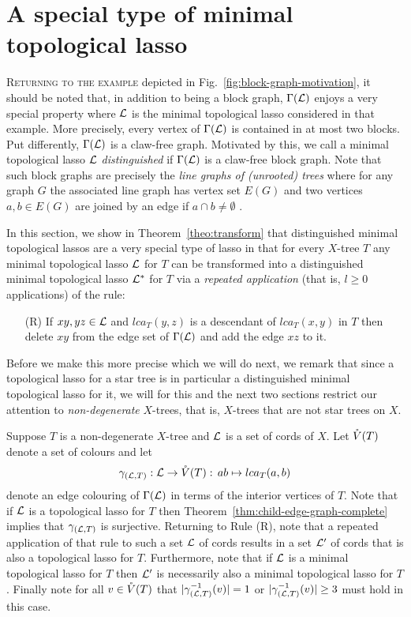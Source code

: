 \section{A special type of minimal topological lasso}
\label{sec:distinguished}

\textsc{Returning to the example} depicted in
Fig.~\ref{fig:block-graph-motivation}, it should be noted that, in addition to
being a block graph, $\Gamma({\mathcal L})$ enjoys a very special property where ${\mathcal L}$
is the minimal topological lasso considered in that example. More precisely,
every vertex of $\Gamma({\mathcal L})$ is contained in at most two blocks.  Put
differently, $\Gamma({\mathcal L})$ is a claw-free graph. Motivated by this, we call a
minimal topological lasso ${\mathcal L}$ {\em distinguished} if $\Gamma({\mathcal L})$ is a
claw-free block graph.  Note that such block graphs are precisely the {\em
  line graphs of (unrooted) trees} where for any graph $G$ the associated line
graph has vertex set $E(G)$ and two vertices $a,b\in E(G)$ are joined by an
edge if $a\cap b\not=\emptyset$ \cite{H72}.

In this section, we show in Theorem~\ref{theo:transform} that distinguished
minimal topological lassos are a very special type of lasso in that for every
$X$-tree $T$ any minimal topological lasso ${\mathcal L}$ for $T$ can be transformed
into a distinguished minimal topological lasso ${\mathcal L}^*$ for $T$ via a {\em
  repeated application} (that is, $l\geq 0$ applications) of the rule:

\begin{enumerate}
\item[(R)] If $xy,yz\in {\mathcal L}$ and $lca_T(y,z)$ is a descendant of $lca_T(x,y)$
  in $T$ then delete $xy$ from the edge set of $\Gamma({\mathcal L})$ and add the edge
  $xz$ to it.
\end{enumerate}

Before we make this more precise which we will do next, we remark that since a
topological lasso for a star tree is in particular a distinguished minimal
topological lasso for it, we will for this and the next two sections restrict
our attention to {\em non-degenerate} $X$-trees, that is, $X$-trees that are
not star trees on $X$.

Suppose $T$ is a non-degenerate $X$-tree and ${\mathcal L}$ is a set of cords of
$X$. Let $\mathring{V}(T)$ denote a set of colours and let
$$
\gamma_{({\mathcal L},T)}:{\mathcal L}\to \mathring{V}(T):\, ab\mapsto lca_T(a,b)
$$
denote an edge colouring of $\Gamma({\mathcal L})$ in terms of the interior vertices of
$T$. Note that if ${\mathcal L}$ is a topological lasso for $T$ then
Theorem~\ref{thm:child-edge-graph-complete} implies that $\gamma_{({\mathcal L},T)}$
is surjective. Returning to Rule (R), note that a repeated application of that
rule to such a set ${\mathcal L}$ of cords results in a set ${\mathcal L}'$ of cords that is
also a topological lasso for $T$. Furthermore, note that if ${\mathcal L}$ is a minimal
topological lasso for $T$ then ${\mathcal L}'$ is necessarily also a minimal
topological lasso for $T$. Finally note for all $v\in \mathring{V}(T)$ that
$|\gamma_{({\mathcal L},T)}^{-1}(v)|=1$ or $|\gamma_{({\mathcal L},T)}^{-1}(v)|\geq 3$ must hold
in this case.


